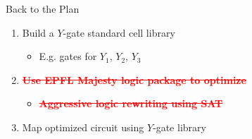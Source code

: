 \begin{frame}[t]{}
	\Huge Back to the Plan
	\normalsize
	\begin{enumerate}
		\item Build a $Y$-gate standard cell library
			\begin{itemize}
				\item E.g. gates for $Y_1$, $Y_2$, $Y_3$
			\end{itemize}
		\item \textbf{\textcolor{red}{\st{Use EPFL Majesty logic package to optimize}}}
			\begin{itemize}
				\item \textbf{\textcolor{red}{\st{Aggressive logic rewriting using SAT}}}
			\end{itemize}
		\item Map optimized circuit using $Y$-gate library
	\end{enumerate}
\end{frame}


